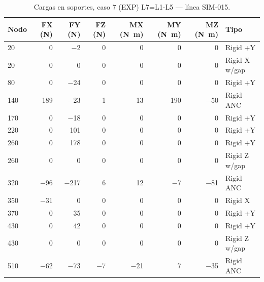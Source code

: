 \begin{table}[htbp]
  \centering
  \footnotesize
  \caption{Cargas en soportes, caso 7 (EXP) L7=L1-L5 — línea SIM-015.}
  \label{tab:restricciones-exp}
  \begin{tabular}{lrrrrrrl}
    \toprule
    Nodo & FX (\si{N}) & FY (\si{N}) & FZ (\si{N}) & MX (\si{N.m}) & MY (\si{N.m}) & MZ (\si{N.m}) & Tipo \\
    \midrule
    20 & \num{0} & \num{-2} & \num{0} & \num{0} & \num{0} & \num{0} & Rigid +Y \\
    20 & \num{0} & \num{0} & \num{0} & \num{0} & \num{0} & \num{0} & Rigid X w/gap \\
    80 & \num{0} & \num{-24} & \num{0} & \num{0} & \num{0} & \num{0} & Rigid +Y \\
    140 & \num{189} & \num{-23} & \num{1} & \num{13} & \num{190} & \num{-50} & Rigid ANC \\
    170 & \num{0} & \num{-18} & \num{0} & \num{0} & \num{0} & \num{0} & Rigid +Y \\
    220 & \num{0} & \num{101} & \num{0} & \num{0} & \num{0} & \num{0} & Rigid +Y \\
    260 & \num{0} & \num{178} & \num{0} & \num{0} & \num{0} & \num{0} & Rigid +Y \\
    260 & \num{0} & \num{0} & \num{0} & \num{0} & \num{0} & \num{0} & Rigid Z w/gap \\
    320 & \num{-96} & \num{-217} & \num{6} & \num{12} & \num{-7} & \num{-81} & Rigid ANC \\
    350 & \num{-31} & \num{0} & \num{0} & \num{0} & \num{0} & \num{0} & Rigid X \\
    370 & \num{0} & \num{35} & \num{0} & \num{0} & \num{0} & \num{0} & Rigid +Y \\
    430 & \num{0} & \num{42} & \num{0} & \num{0} & \num{0} & \num{0} & Rigid +Y \\
    430 & \num{0} & \num{0} & \num{0} & \num{0} & \num{0} & \num{0} & Rigid Z w/gap \\
    510 & \num{-62} & \num{-73} & \num{-7} & \num{-21} & \num{7} & \num{-35} & Rigid ANC \\
    \bottomrule
  \end{tabular}
\end{table}
